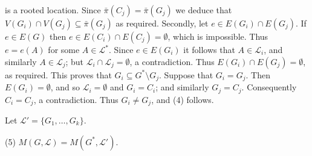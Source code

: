 \noindent is a rooted location. Since $\bar{\pi}(C_j) = \bar{\pi}(G_j)$ we deduce that $V(G_i) \cap V(G_j) \subseteq \bar{\pi}(G_j)$ as required. Secondly, let $e \in E(G_i) \cap E(G_j)$. If $e \in E(G)$ then $e \in E(C_i) \cap E(C_j) = \emptyset$, which is impossible. Thus $e = e(A)$ for some $A \in \mathscr{L}^*$. Since $e \in E(G_i)$ it follows that $A \in \mathscr{L}_i$, and similarly $A \in \mathscr{L}_j$; but $\mathscr{L}_i \cap \mathscr{L}_j = \emptyset$, a contradiction. Thus $E(G_i) \cap E(G_j) = \emptyset$, as required. This proves that $G_i \subseteq G^* \setminus G_j$. Suppose that $G_i = G_j$. Then $E(G_i) = \emptyset$, and so $\mathscr{L}_i = \emptyset$ and $G_i = C_i$; and similarly $G_j = C_j$. Consequently $C_i = C_j$, a contradiction. Thus $G_i \ne G_j$, and (4) follows.

Let $\mathscr{L}' = \{G_1, \dots, G_k\}$.

\hspace*{12pt}(5) $M(G, \mathscr{L}) = M(G^*, \mathscr{L}')$.

